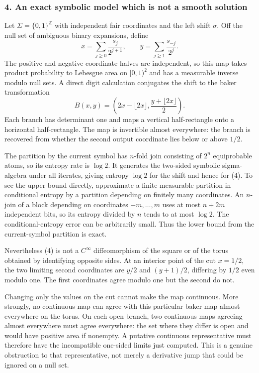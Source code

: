 \documentclass[11pt]{article}
\begin{document}
\subsubsection{4. An exact symbolic model which is not a smooth solution}
Let $\Sigma=\{0,1\}^{\mathbb Z}$ with independent fair coordinates and the left shift $\sigma$. Off the null set of ambiguous binary expansions, define
\[
 x=\sum_{j\geq0}\frac{s_j}{2^{j+1}},\qquad
 y=\sum_{j\geq1}\frac{s_{-j}}{2^j}.
\]
The positive and negative coordinate halves are independent, so this map takes product probability to Lebesgue area on $[0,1)^2$ and has a measurable inverse modulo null sets. A direct digit calculation conjugates the shift to the baker transformation
\[
 B(x,y)=\left(2x-\lfloor2x\rfloor,
             \frac{y+\lfloor2x\rfloor}{2}\right).         \tag{4}
\]
Each branch has determinant one and maps a vertical half-rectangle onto a horizontal half-rectangle. The map is invertible almost everywhere: the branch is recovered from whether the second output coordinate lies below or above $1/2$.

The partition by the current symbol has $n$-fold join consisting of $2^n$ equiprobable atoms, so its entropy rate is $\log2$. It generates the two-sided symbolic sigma-algebra under all iterates, giving entropy $\log2$ for the shift and hence for (4). To see the upper bound directly, approximate a finite measurable partition in conditional entropy by a partition depending on finitely many coordinates. An $n$-join of a block depending on coordinates $-m,\ldots,m$ uses at most $n+2m$ independent bits, so its entropy divided by $n$ tends to at most $\log2$. The conditional-entropy error can be arbitrarily small. Thus the lower bound from the current-symbol partition is exact.

Nevertheless (4) is not a $C^\infty$ diffeomorphism of the square or of the torus obtained by identifying opposite sides. At an interior point of the cut $x=1/2$, the two limiting second coordinates are $y/2$ and $(y+1)/2$, differing by $1/2$ even modulo one. The first coordinates agree modulo one but the second do not.

Changing only the values on the cut cannot make the map continuous. More strongly, no continuous map can agree with this particular baker map almost everywhere on the torus. On each open branch, two continuous maps agreeing almost everywhere must agree everywhere: the set where they differ is open and would have positive area if nonempty. A putative continuous representative must therefore have the incompatible one-sided limits just computed. This is a genuine obstruction to that representative, not merely a derivative jump that could be ignored on a null set.
\end{document}
